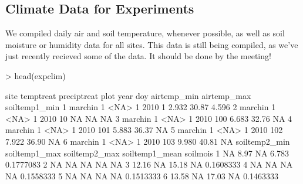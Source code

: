\documentclass{article}
\begin{document}
\subsection{Climate Data for Experiments}
We compiled daily air and soil temperature, whenever possible, as well as soil moisture or humidity data for all sites. This data is still being compiled, as we've just recently recieved some of the data. It should be done by the meeting!
\begin{Schunk}
\begin{Sinput}
> head(expclim)
\end{Sinput}
\begin{Soutput}
     site temptreat preciptreat plot year doy airtemp_min airtemp_max soiltemp1_min
1 marchin         1        <NA>    1 2010   1       2.932       30.87         4.596
2 marchin         1        <NA>    1 2010  10          NA          NA            NA
3 marchin         1        <NA>    1 2010 100       6.683       32.76            NA
4 marchin         1        <NA>    1 2010 101       5.883       36.37            NA
5 marchin         1        <NA>    1 2010 102       7.922       36.90            NA
6 marchin         1        <NA>    1 2010 103       9.980       40.81            NA
  soiltemp2_min soiltemp1_max soiltemp2_max soiltemp1_mean  soilmois
1            NA          8.97            NA          6.783 0.1777083
2            NA            NA            NA             NA        NA
3         12.16            NA         15.18             NA 0.1608333
4            NA            NA            NA             NA 0.1558333
5            NA            NA            NA             NA 0.1513333
6         13.58            NA         17.03             NA 0.1463333
\end{Soutput}
\end{Schunk}
\end{document}
